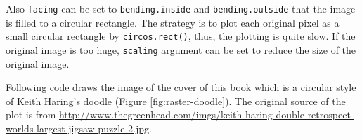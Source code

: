 \documentclass[]{book}
\newenvironment{Shaded}{\begin{snugshade}}{\end{snugshade}}
\newcommand{\KeywordTok}[1]{\textcolor[rgb]{0.13,0.29,0.53}{\textbf{#1}}}
\newcommand{\DataTypeTok}[1]{\textcolor[rgb]{0.13,0.29,0.53}{#1}}
\newcommand{\DecValTok}[1]{\textcolor[rgb]{0.00,0.00,0.81}{#1}}
\newcommand{\FloatTok}[1]{\textcolor[rgb]{0.00,0.00,0.81}{#1}}
\newcommand{\StringTok}[1]{\textcolor[rgb]{0.31,0.60,0.02}{#1}}
\newcommand{\OtherTok}[1]{\textcolor[rgb]{0.56,0.35,0.01}{#1}}
\newcommand{\ControlFlowTok}[1]{\textcolor[rgb]{0.13,0.29,0.53}{\textbf{#1}}}
\newcommand{\OperatorTok}[1]{\textcolor[rgb]{0.81,0.36,0.00}{\textbf{#1}}}
\newcommand{\NormalTok}[1]{#1}
\theoremstyle{definition}
\theoremstyle{definition}
\theoremstyle{remark}
\begin{document}
Also \texttt{facing} can be set to \texttt{bending.inside} and
\texttt{bending.outside} that the image is filled to a circular
rectangle. The strategy is to plot each original pixel as a small
circular rectangle by \texttt{circos.rect()}, thus, the plotting is
quite slow. If the original image is too huge, \texttt{scaling} argument
can be set to reduce the size of the original image.

Following code draws the image of the cover of this book which is a
circular style of
\href{https://en.wikipedia.org/wiki/Keith_Haring}{Keith Haring}'s doodle
(Figure \ref{fig:raster-doodle}). The original source of the plot is
from
\url{http://www.thegreenhead.com/imgs/keith-haring-double-retrospect-worlds-largest-jigsaw-puzzle-2.jpg}.

\begin{Shaded}
\end{Shaded}
\end{document}

